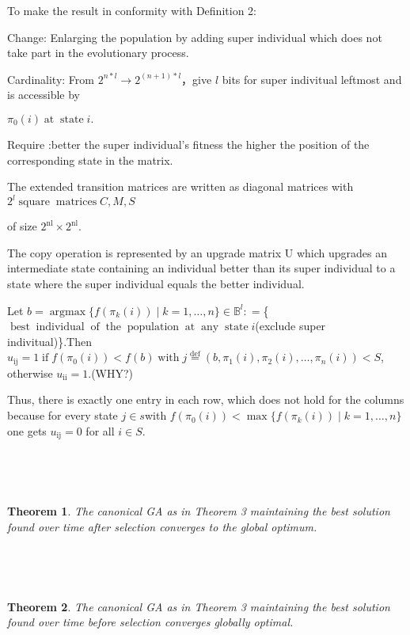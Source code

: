 \documentclass{article}
\newcommand{\tmop}[1]{\ensuremath{\operatorname{#1}}}
\newtheorem{theorem}{Theorem}
\begin{document}
To make the result in conformity with Definition 2:

Change: Enlarging the population by adding {\color[HTML]{AAAAFF}super
individual} which does not take part in the evolutionary process.

Cardinality: From $2^{n \ast l} \rightarrow 2^{(n + 1) \ast l}$，give $l$
bits for super indivitual leftmost and is accessible by

$\pi_0 (i) \tmop{at} \tmop{state} i.$

Require :better the super individual's fitness the higher the position of the
corresponding state in the matrix.

The extended transition matrices are written as diagonal matrices with $2^l
\tmop{square} \tmop{matrices} C, M, S \quad$

of size $2^{\tmop{nl}} \times 2^{\tmop{nl}}$.

The copy operation is represented by an upgrade matrix U which upgrades an
intermediate state containing an individual better than its super individual
to a state where the super individual equals the better individual.

Let $b = \tmop{argmax} \{ f (\pi_k  (i)) \mid k = 1, \ldots, n \} \in
\mathbb{B}^l : =$\{$\tmop{best} \tmop{individual} \tmop{of} \tmop{the}
\tmop{population} \tmop{at} \tmop{any} \tmop{state} i$(exclude super
indivitual)\}.Then $u_{\tmop{ij}} = 1 \tmop{if} f (\pi_0 (i)) < f (b)
\tmop{with} j \overset{\tmop{def}}{=} (b, \pi_1 (i), \pi_2 (i), \ldots, \pi_n
(i)) < S$, otherwise $u_{\tmop{ii}} = 1$.(WHY?)

Thus, there is exactly one entry in each row, which does not hold for the
columns because for every state $j \in s$with $f (\pi_0 (i)) < \max \{ f
(\pi_k  (i)) \mid k = 1, \ldots, n \} $one gets $u_{\tmop{ij}} = 0$ for all $i
\in S.$

\

\

\begin{theorem}
  The canonical GA as in Theorem 3 maintaining the best solution found over
  time after selection converges to the global optimum.
\end{theorem}

\

\

\begin{theorem}
  The canonical GA as in Theorem 3 maintaining the best solution found over
  time before selection converges globally optimal.
\end{theorem}
\end{document}
